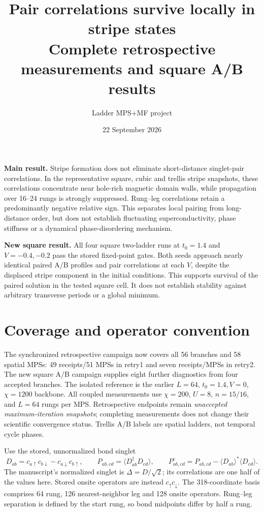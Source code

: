 \documentclass[11pt,letterpaper]{article}
\title{Pair correlations survive locally in stripe states\\
\large Complete retrospective measurements and square A/B results}
\author{Ladder MPS+MF project}
\date{22 September 2026}
\newcommand{\pc}{P^{\mathrm c}}
\begin{document}
\maketitle

\noindent\textbf{Main result.}
Stripe formation does not eliminate short-distance singlet-pair correlations.
In the representative square, cubic and trellis stripe snapshots, these
correlations concentrate near hole-rich magnetic domain walls, while propagation
over 16--24 rungs is strongly suppressed. Rung--leg correlations retain a
predominantly negative relative sign. This separates local pairing from
long-distance order, but does not establish fluctuating superconductivity,
phase stiffness or a dynamical phase-disordering mechanism.

\noindent\textbf{New square result.}
All four square two-ladder runs at $t_0=1.4$ and $V=-0.4,-0.2$ pass the
stored fixed-point gates. Both seeds approach nearly identical paired A/B
profiles and pair correlations at each $V$, despite the displaced stripe
component in the initial conditions. This supports survival of the paired
solution in the tested square cell. It does not establish stability against
arbitrary transverse periods or a global minimum.

\section{Coverage and operator convention}
The synchronized retrospective campaign now covers all 56 branches and
58 spatial MPSs: 49 receipts/51 MPSs in retry1 and seven receipts/MPSs in
retry2. The new square A/B campaign supplies eight further diagnostics from
four accepted branches. The isolated reference is the earlier $L=64$,
$t_0=1.4,V=0$, $\chi=1200$ backbone. All coupled measurements use $\chi=200$,
$U=8$, $n=15/16$, and $L=64$ rungs per MPS. Retrospective endpoints remain
\emph{unaccepted maximum-iteration snapshots}; completing measurements does
not change their scientific convergence status. Trellis A/B labels are
spatial ladders, not temporal cycle phases.

Use the stored, unnormalized bond singlet
\begin{equation}
 D_{ab}=c_{a\uparrow}c_{b\downarrow}-c_{a\downarrow}c_{b\uparrow},\qquad
 P_{ab,cd}=\langle D_{ab}^{\dagger}D_{cd}\rangle,\qquad
 \pc_{ab,cd}=P_{ab,cd}-\langle D_{ab}\rangle^*\langle D_{cd}\rangle.
\end{equation}
The manuscript's normalized singlet is $\Delta=D/\sqrt2$; its correlations
are one half of the values here. Stored onsite operators are instead
$c_\uparrow c_\downarrow$. The 318-coordinate basis comprises 64 rung,
126 nearest-neighbor leg and 128 onsite operators. Rung--leg separation is
defined by the start rung, so bond midpoints differ by half a rung.
\end{document}

